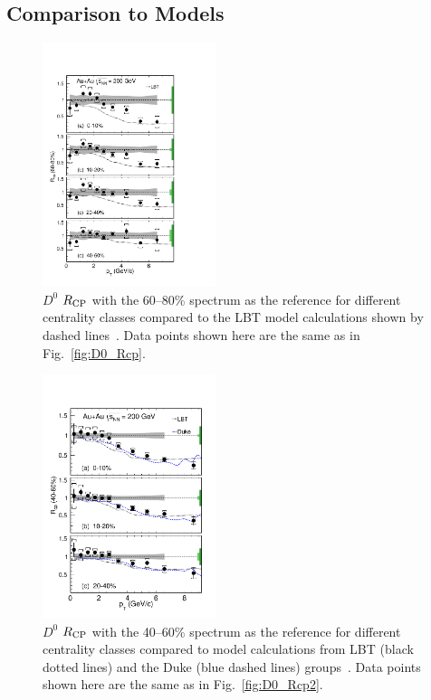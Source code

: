 \documentclass[%
 reprint,	
showpacs,
 amsmath,amssymb,
 aps,
 prc,
]{revtex4-1}
\begin{document}
\subsection{Comparison to Models}
\label{result:theory}

\begin{figure}
\centering
\includegraphics[width=0.45\textwidth]{fig/D0_Rcp11.pdf}
\caption{$D^{0}$ $R_{\rm CP}$ with the 60--80\% spectrum as the reference for different centrality classes compared to the LBT model calculations shown by dashed lines~\cite{Cao:2016gvr,LBT:private}. Data points shown here are the same as in Fig.~\ref{fig:D0_Rcp}.}
\label{fig:D0_Rcp11} 
\end{figure}

\begin{figure}
\centering
\includegraphics[width=0.45\textwidth]{fig/D0_Rcp22.pdf}
  \caption{$D^{0}$ $R_{\rm CP}$ with the 40--60\% spectrum as the reference for different centrality classes compared to model calculations from LBT (black dotted lines) and the Duke (blue dashed lines) groups~\cite{Cao:2016gvr,LBT:private,Xu:2017obm}. Data points shown here are the same as in Fig.~\ref{fig:D0_Rcp2}.}
\label{fig:D0_Rcp22} 
\end{figure}
\end{document}
